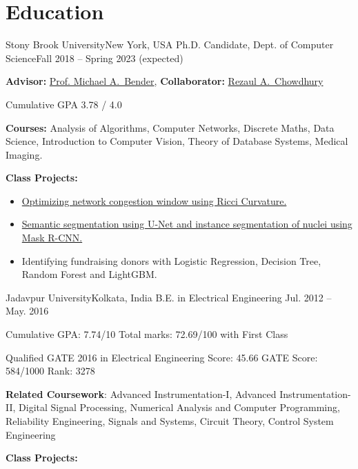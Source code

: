 \documentclass[letterpaper,10pt]{article}
\begin{document}
\section*{Education}
\resumeSubHeadingListStart
\resumeSubheading
{Stony Brook University}{New York, USA}
{Ph.D. Candidate, Dept. of Computer Science}{Fall 2018 -- Spring 2023 (expected)}
\resumeItemListStart
\item \textbf{Advisor:} \href{https://www3.cs.stonybrook.edu/~bender/}{Prof. Michael A.\ Bender}, \textbf{Collaborator:} \href{https://www3.cs.stonybrook.edu/~rezaul/}{Rezaul A.\ Chowdhury}
\item Cumulative GPA 3.78 / 4.0
\item \textbf{Courses:} Analysis of Algorithms, Computer Networks, Discrete Maths, Data Science, Introduction to Computer Vision, Theory of Database Systems, Medical Imaging.
\item \textbf{Class Projects:} 
\begin{itemize}
    \item \href{https://github.com/ArghyaB118/network_curvature/blob/master/Text/project_534.pdf}{Optimizing network congestion window using Ricci Curvature.}
    \item \href{https://github.com/ArghyaB118/Image_Segmentation/blob/main/Project_CSE527/Final_Report.pdf}{Semantic segmentation using U-Net and instance segmentation of nuclei using Mask R-CNN.}
    \item {Identifying fundraising donors with Logistic Regression, Decision Tree, Random Forest and LightGBM.}
\end{itemize}
\resumeItemListEnd
\resumeSubheading
{Jadavpur University}{Kolkata, India}
{B.E. in Electrical Engineering }{Jul. 2012 -- May. 2016}
\resumeItemListStart
\item {Cumulative GPA: 7.74/10 Total marks: 72.69/100 with First Class}
\item {Qualified GATE 2016 in Electrical Engineering Score: 45.66 GATE Score: 584/1000 Rank: 3278}
\item {\textbf{Related Coursework}: Advanced Instrumentation-I, Advanced Instrumentation-II, Digital Signal Processing, Numerical Analysis and Computer Programming, Reliability Engineering, Signals and Systems, Circuit Theory, Control System Engineering}
\item \textbf{Class Projects:} 
\end{document}
